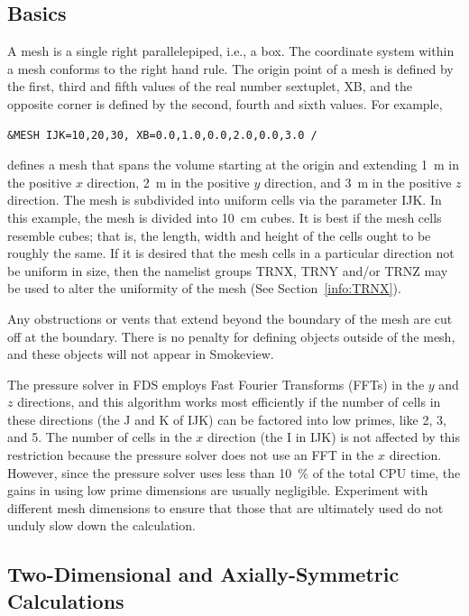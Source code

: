 \documentclass[11pt]{book}
\begin{document}
\subsection{Basics}
\label{info:MESH_Basics}

A mesh is a single right parallelepiped, i.e., a box. The coordinate system within a mesh conforms to the right hand rule. The origin point of a mesh is defined by the first, third and fifth values of the real number sextuplet, {\ct XB}, and the opposite corner is defined by the second, fourth and sixth values. For example,
\begin{lstlisting}
&MESH IJK=10,20,30, XB=0.0,1.0,0.0,2.0,0.0,3.0 /
\end{lstlisting}
defines a mesh that spans the volume starting at the origin and extending 1~m in the positive $x$ direction, 2~m in the positive $y$ direction, and 3~m in the positive $z$ direction. The mesh is subdivided into uniform cells via the parameter {\ct IJK}. In this example, the mesh is divided into 10~cm cubes. It is best if the mesh cells resemble cubes; that is, the length, width and height of the cells ought to be roughly the same. If it is desired that the mesh cells in a particular direction not be uniform in size, then the namelist groups {\ct TRNX}, {\ct TRNY} and/or {\ct TRNZ} may be used to alter the uniformity of the mesh (See Section~\ref{info:TRNX}).

Any obstructions or vents that extend beyond the boundary of the mesh are cut off at the boundary. There is no penalty for defining objects outside of the mesh, and these objects will not appear in Smokeview.

The pressure solver in FDS employs Fast Fourier Transforms (FFTs) in the $y$ and $z$ directions, and this algorithm works most efficiently if the number of cells in these directions (the {\ct J} and {\ct K} of {\ct IJK}) can be factored into low primes, like 2, 3, and 5. The number of cells in the $x$ direction (the {\ct I} in {\ct IJK}) is not affected by this restriction because the pressure solver does not use an FFT in the $x$ direction. However, since the pressure solver uses less than 10~\% of the total CPU time, the gains in using low prime dimensions are usually negligible. Experiment with different mesh dimensions to ensure that those that are ultimately used do not unduly slow down the calculation.



\subsection{Two-Dimensional and Axially-Symmetric Calculations}
\label{info:2D}
\end{document}
